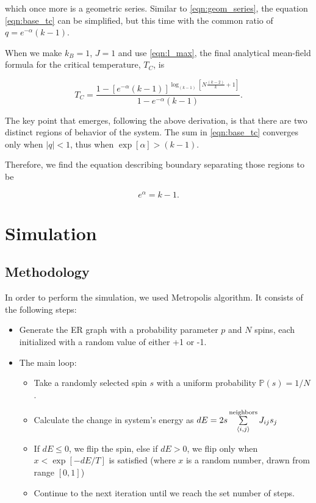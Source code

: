 \documentclass[11pt,a4paper]{article}
\begin{document}
which once more is a geometric series. Similar to \eqref{eqn:geom_series}, the equation \eqref{eqn:base_tc} can be simplified, but this time with the common ratio of $q=e^{-\alpha}(k-1)$.

When we make $k_B=1$, $J=1$ and use \eqref{eqn:l_max}, the final analytical mean-field formula for the critical temperature, $T_C$, is

\begin{equation}
    T_C = \frac{1 - [e^{-\alpha}(k-1)]^{\log_{(k-1)}{\left[N\frac{(k-2)}{k} + 1\right]}}}{1 - e^{-\alpha}(k-1)}.
\end{equation}

The key point that emerges, following the above derivation, is that there are two distinct regions of behavior of the system. The sum in \eqref{eqn:base_tc} converges only when $|q|<1$, thus when $\exp[\alpha] > (k-1)$.

Therefore, we find the equation describing boundary separating those regions to be

\begin{equation}
    e^\alpha = k-1.
\end{equation}

\section{Simulation}

\subsection{Methodology}

In order to perform the simulation, we used Metropolis algorithm. It consists of the following steps:
\begin{itemize}
    \item Generate the ER graph with a probability parameter $p$ and $N$ spins, each initialized with a random value of either +1 or -1.
    \item The main loop:
        \begin{itemize}
            \item Take a randomly selected spin $s$ with a uniform probability $\mathbb{P}(s)=1/N$.
            \item Calculate the change in system's energy as $dE = 2 s \sum\limits_{\braket{i,j}}^\text{neighbors} J_{ij} s_j$
            \item If $dE\leq0$, we flip the spin, else if $dE>0$, we flip only when $x < \exp[-dE/T]$ is satisfied (where $x$ is a random number, drawn from range $[0,1]$)
            \item Continue to the next iteration until we reach the set number of steps.
        \end{itemize}
\end{itemize}
\end{document}
